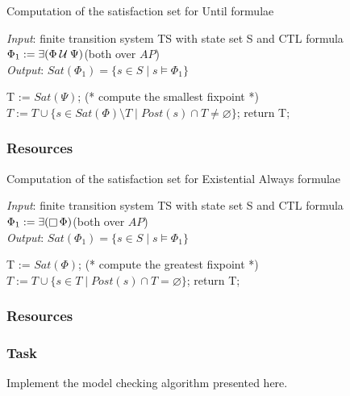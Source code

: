 \documentclass{article}
\begin{document}
\begin{algorithm}[H]
    \caption{Computation of the satisfaction set for Until formulae}
    \hspace*{\algorithmicindent} \emph{Input}: finite transition system TS with state set S and CTL formula $\Phi_1 := \exists (\Phi \mathbin{\mathcal{U}} \Psi)$(both over $AP$) \\
    \hspace*{\algorithmicindent} \emph{Output}: $Sat(\Phi_1) = \{ s \in S \mid s \vDash \Phi_1 \}$
    \begin{algorithmic}[1]
        \State T := $Sat(\Psi)$; (* compute the smallest fixpoint *)
            \State $ T := T \cup \{ s \in Sat(\Phi) \setminus T \mid Post(s) \cap T \neq \varnothing \} $;
        \EndWhile
    \State return T;
    \end{algorithmic}
\end{algorithm}
\subsubsection{Resources}
\cite[Paragraph 6.4]{BaKa}

\begin{algorithm}[H]
    \caption{Computation of the satisfaction set for Existential Always formulae}
    \hspace*{\algorithmicindent} \emph{Input}: finite transition system TS with state set S and CTL formula $\Phi_1 := \exists (\mathop{\square} \Phi)$(both over $AP$) \\
    \hspace*{\algorithmicindent} \emph{Output}: $Sat(\Phi_1) = \{ s \in S \mid s \vDash \Phi_1  \}$
    \begin{algorithmic}[1]
        \State T := $Sat(\Phi)$; (* compute the greatest fixpoint *)
            \State $ T := T \cup \{ s \in T \mid Post(s) \cap T = \varnothing \} $;
        \EndWhile
    \State return T;
    \end{algorithmic}
\end{algorithm}
\subsubsection{Resources}
\cite[Paragraph 6.4]{BaKa}

\subsubsection*{Task}
Implement the model checking algorithm presented here.
\end{document}
